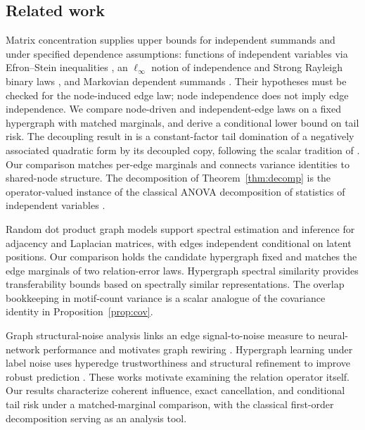 \documentclass[preprint,11pt]{elsarticle}
\begin{document}
\subsection{Related work}
Matrix concentration supplies upper bounds for independent summands
\cite{tropp2012user} and under specified dependence assumptions:
functions of independent variables via Efron--Stein inequalities
\cite{paulin2016efronstein}, an $\ell_\infty$ notion of independence and
Strong Rayleigh binary laws \cite{amparore2025dependent}, and Markovian
dependent summands \cite{geuchen2024matrix}. Their hypotheses must
be checked for the node-induced edge law; node independence does not
imply edge independence. We compare node-driven and independent-edge
laws on a fixed hypergraph with matched marginals, and derive a
conditional lower bound on tail risk. The decoupling result in
\cite{amparore2025dependent} is a constant-factor tail domination of a
negatively associated quadratic form by its decoupled copy, following
the scalar tradition of \cite{delapena1999decoupling}. Our comparison
matches per-edge marginals and connects variance identities to
shared-node structure. The decomposition of Theorem~\ref{thm:decomp} is the
operator-valued instance of the classical ANOVA decomposition of
statistics of independent variables \cite{hoeffding1948class}. 

Random dot product graph models \cite{athreya2018statistical} support
spectral estimation and inference for adjacency and Laplacian matrices,
with edges independent conditional on latent positions. Our comparison
holds the candidate hypergraph fixed and matches the edge marginals of
two relation-error laws. Hypergraph spectral similarity
\cite{hayhoe24spectral} provides transferability bounds based on
spectrally similar representations. The overlap bookkeeping in
motif-count variance \cite{matias2006motifs} is a scalar analogue of
the covariance identity in Proposition~\ref{prop:cov}.

Graph structural-noise analysis links an edge signal-to-noise measure to
neural-network performance and motivates graph rewiring
\cite{dong23structural}. Hypergraph learning under label noise uses
hyperedge trustworthiness and structural refinement to improve robust
prediction \cite{huang26trustworthy}. These works motivate examining the
relation operator itself. Our results characterize coherent influence,
exact cancellation, and conditional tail risk under a matched-marginal
comparison, with the classical first-order decomposition serving as an
analysis tool.
\end{document}
